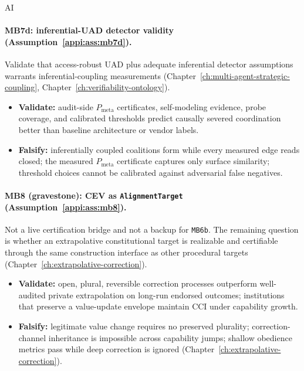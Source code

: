 \begin{authbar}{AI}
\paragraph{MB7d: inferential-UAD detector validity (Assumption~\ref{appi:ass:mb7d}).}
Validate that access-robust UAD plus adequate inferential detector assumptions warrants inferential-coupling measurements (Chapter~\ref{ch:multi-agent-strategic-coupling}, Chapter~\ref{ch:verifiability-ontology}).
\begin{itemize}[nosep]
  \item \textbf{Validate:} audit-side \(P_{\text{meta}}\) certificates, self-modeling evidence, probe coverage, and calibrated thresholds predict causally severed coordination better than baseline architecture or vendor labels.
  \item \textbf{Falsify:} inferentially coupled coalitions form while every measured edge reads closed; the measured \(P_{\text{meta}}\) certificate captures only surface similarity; threshold choices cannot be calibrated against adversarial false negatives.
\end{itemize}

\paragraph{MB8 (gravestone): CEV as \texttt{AlignmentTarget} (Assumption~\ref{appi:ass:mb8}).}
Not a live certification bridge and not a backup for \texttt{MB6b}.
The remaining question is whether an extrapolative constitutional target is realizable and certifiable through the same construction interface as other procedural targets (Chapter~\ref{ch:extrapolative-correction}).
\begin{itemize}[nosep]
  \item \textbf{Validate:} open, plural, reversible correction processes outperform well-audited private extrapolation on long-run endorsed outcomes; institutions that preserve a value-update envelope maintain \(\mathrm{CCI}\) under capability growth.
  \item \textbf{Falsify:} legitimate value change requires no preserved plurality; correction-channel inheritance is impossible across capability jumps; shallow obedience metrics pass while deep correction is ignored (Chapter~\ref{ch:extrapolative-correction}).
\end{itemize}


\end{authbar}
